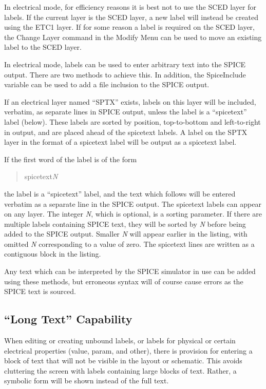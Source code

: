 In electrical mode, for efficiency reasons it is best not to use the
SCED layer for labels.  If the current layer is the SCED layer, a new
label will instead be created using the ETC1 layer.  If for some
reason a label is required on the SCED layer, the {\cb Change Layer}
command in the {\cb Modify Menu} can be used to move an existing label
to the SCED layer.

In electrical mode, labels can be used to enter arbitrary text into
the SPICE output.  There are two methods to achieve this.  In
addition, the {\et SpiceInclude} variable can be used to add a file
inclusion to the SPICE output.

If an electrical layer named ``SPTX'' exists, labels on this layer
will be included, verbatim, as separate lines in SPICE output, unless
the label is a ``spicetext'' label (below).  These labels are sorted
by position, top-to-bottom and left-to-right in output, and are placed
ahead of the spicetext labels.  A label on the SPTX layer in the
format of a spicetext label will be output as a spicetext label.

If the first word of the label is of the form
\begin{quote}\vt
spicetext{\it N}
\end{quote}
the label is a ``spicetext'' label, and the text which follows will be
entered verbatim as a separate line in the SPICE output.  The
spicetext labels can appear on any layer.  The integer {\it N\/},
which is optional, is a sorting parameter.  If there are multiple
labels containing SPICE text, they will be sorted by {\it N\/} before
being added to the SPICE output.  Smaller {\it N\/} will appear
earlier in the listing, with omitted {\it N\/} corresponding to a
value of zero.  The {\vt spicetext\/} lines are written as a
contiguous block in the listing.

Any text which can be interpreted by the SPICE simulator in use can be
added using these methods, but erroneous syntax will of course cause
errors as the SPICE text is sourced.

\subsection{``Long Text'' Capability}
\label{longtext}

When editing or creating unbound labels, or labels for physical or
certain electrical properties ({\et value}, {\et param}, and {\et
other}), there is provision for entering a block of text that will not
be visible in the layout or schematic.  This avoids cluttering the
screen with labels containing large blocks of text.  Rather, a
symbolic form will be shown instead of the full text.

